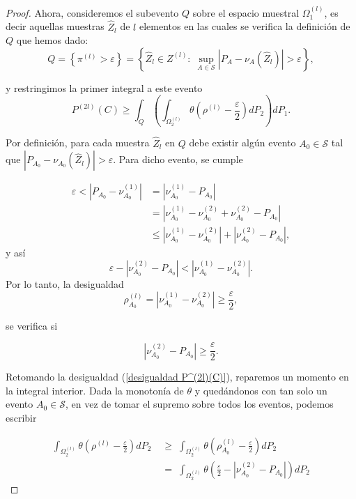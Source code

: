 \documentclass{report}
\begin{document}
\begin{proof}
Ahora, consideremos el subevento $Q$ sobre el espacio muestral $\Omega_1^{(l)}$, es decir aquellas muestras $\hat{Z}_l$ de $l$
elementos en las cuales se verifica la definición de $Q$ que hemos dado:
\[
Q = \left\{ \pi^{(l)} > \varepsilon \right\} = \left\{\hat{Z}_l\in Z^{(l)}:\;
\sup_{A\in\mathcal{S}}\left|P_A - \nu_A\left(\hat{Z}_l\right)\right| > \varepsilon \right\},
\]

y restringimos la primer integral a este evento
\begin{equation}
P^{(2l)}(C) \geq \int_{Q} \left( \int_{ \Omega_2^{(l)}}  \theta\left(\rho^{(l)}-\frac{\varepsilon}{2}\right) dP_2\right) dP_1. \label{desigualdad P^(2l)(C)}
\end{equation}

Por definición, para cada muestra $\hat{Z}_l$ en $Q$ debe existir algún evento $A_0\in\mathcal{S}$ tal que $|P_{A_0}-\nu_{A_0}\left(\hat{Z}_l\right)|>\varepsilon$.
Para dicho evento, se cumple

\[
\begin{aligned}
    \varepsilon < \left|P_{A_0}-\nu_{A_0}^{(1)}\right| &= \left|\nu_{A_0}^{(1)}-P_{A_0}\right|\\
    & = \left|\nu_{A_0}^{(1)}-\nu_{A_0}^{(2)}+\nu_{A_0}^{(2)}-P_{A_0}\right| \\
    & \leq \left|\nu_{A_0}^{(1)}-\nu_{A_0}^{(2)}\right|+\left|\nu_{A_0}^{(2)}-P_{A_0}\right|,
\end{aligned}
\]
y así
\[
    \varepsilon - \left|\nu_{A_0}^{(2)}-P_{A_0}\right| < \left|\nu_{A_0}^{(1)}-\nu_{A_0}^{(2)}\right|.
\]
Por lo tanto, la desigualdad
\[
\rho_{A_0}^{(l)} = |\nu^{(1)}_{A_0}-\nu^{(2)}_{A_0}| \geq \frac{\varepsilon}{2},
\]

se verifica si

\[
|\nu^{(2)}_{A_0}-P_{A_0}|\geq \frac{\varepsilon}{2}.
\]

Retomando la desigualdad (\ref{desigualdad P^(2l)(C)}), reparemos un momento en la integral interior.
Dada la monotonía de $\theta$ y quedándonos
con tan solo un evento $A_0\in\mathcal{S}$, en vez de tomar el supremo sobre todos los eventos, podemos escribir

\[
\begin{aligned}
\int_{ \Omega_2^{(l)}} \theta\left(\rho^{(l)}-\frac{\varepsilon}{2}\right) dP_2 \;&\geq\; \int_{ \Omega_2^{(l)}}  \theta\left(\rho^{(l)}_{A_0}-\frac{\varepsilon}{2}\right) dP_2 \\
& = \; \int_{ \Omega_2^{(l)}}  \theta\left(\frac{\varepsilon}{2} - |\nu^{(2)}_{A_0}-P_{A_0}|\right) dP_2
\end{aligned}
\]


\end{proof}
\end{document}
